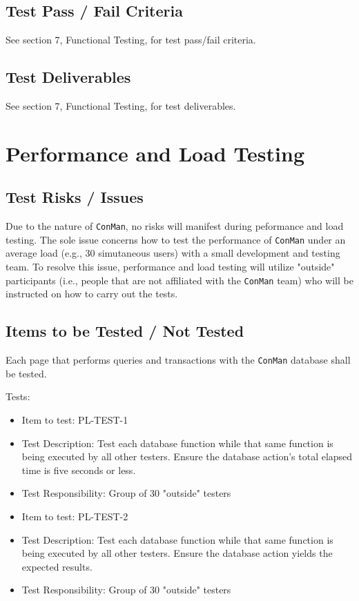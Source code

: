 \documentclass{article}
\begin{document}
\subsection{Test Pass / Fail Criteria}
See section 7, Functional Testing, for test pass/fail criteria.

\subsection{Test Deliverables}
See section 7, Functional Testing, for test deliverables.


\newpage
\section{Performance and Load Testing}
\subsection{Test Risks / Issues}
Due to the nature of \texttt{ConMan}, no risks will manifest during peformance 
and load testing. The sole issue concerns how to test the performance of \texttt{ConMan} 
under an average load (e.g., 30 simutaneous users) with a small development and testing 
team. To resolve this issue, performance and load testing will utilize "outside" 
participants (i.e., people that are not affiliated with the 
\texttt{ConMan} team) who will be instructed on how to carry out the tests.

\subsection{Items to be Tested / Not Tested}
Each page that performs queries and transactions with the \texttt{ConMan} 
database shall be tested.

Tests:
\begin{itemize}
\item Item to test: PL-TEST-1
\item Test Description: Test each database function while that same function is being 
executed by all other testers. Ensure the database action's total elapsed time is 
five seconds or less. 
\item Test Responsibility: Group of 30 "outside" testers
\end{itemize}
\begin{itemize}
\item Item to test: PL-TEST-2
\item Test Description: Test each database function while that same function is being 
executed by all other testers. Ensure the database action yields the expected results. 
\item Test Responsibility: Group of 30 "outside" testers
\end{itemize}
\end{document}
